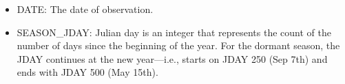 \begin{itemize} 
\item DATE: The date of  observation. 
\item SEASON\_JDAY: Julian day is an integer that represents the count of the number of days since the beginning of the year. For the dormant season, the JDAY continues at the new year---i.e., starts on JDAY 250 (Sep 7th) and ends with JDAY 500 (May 15th). 
\begin{table}[th!]
\centering
{}
\end{table}
\end{itemize}
